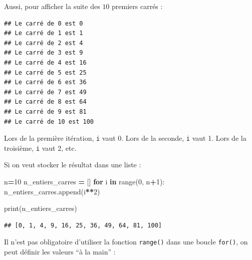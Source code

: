 \documentclass[12pt,]{book}
\newenvironment{Shaded}{\begin{snugshade}}{\end{snugshade}}
\newcommand{\KeywordTok}[1]{\textcolor[rgb]{0.13,0.29,0.53}{\textbf{#1}}}
\newcommand{\DecValTok}[1]{\textcolor[rgb]{0.00,0.00,0.81}{#1}}
\newcommand{\SpecialCharTok}[1]{\textcolor[rgb]{0.00,0.00,0.00}{#1}}
\newcommand{\StringTok}[1]{\textcolor[rgb]{0.31,0.60,0.02}{#1}}
\newcommand{\ControlFlowTok}[1]{\textcolor[rgb]{0.13,0.29,0.53}{\textbf{#1}}}
\newcommand{\OperatorTok}[1]{\textcolor[rgb]{0.81,0.36,0.00}{\textbf{#1}}}
\newcommand{\BuiltInTok}[1]{#1}
\newcommand{\NormalTok}[1]{#1}
\numberwithin{equation}{section}
\numberwithin{countremarque}{section}
\begin{document}
Aussi, pour afficher la suite des \(10\) premiers carrés :

\begin{Shaded}
\end{Shaded}

\begin{lstlisting}
## Le carré de 0 est 0
## Le carré de 1 est 1
## Le carré de 2 est 4
## Le carré de 3 est 9
## Le carré de 4 est 16
## Le carré de 5 est 25
## Le carré de 6 est 36
## Le carré de 7 est 49
## Le carré de 8 est 64
## Le carré de 9 est 81
## Le carré de 10 est 100
\end{lstlisting}

Lors de la première itération, \texttt{i} vaut 0. Lors de la seconde,
\texttt{i} vaut 1. Lors de la troisième, \texttt{i} vaut 2, etc.

Si on veut stocker le résultat dans une liste :

\begin{Shaded}
\begin{Highlighting}[]
\NormalTok{n}\OperatorTok{=}\DecValTok{10}
\NormalTok{n_entiers_carres }\OperatorTok{=}\NormalTok{ []}
\ControlFlowTok{for}\NormalTok{ i }\KeywordTok{in} \BuiltInTok{range}\NormalTok{(}\DecValTok{0}\NormalTok{, n}\OperatorTok{+}\DecValTok{1}\NormalTok{):}
\NormalTok{  n_entiers_carres.append(i}\OperatorTok{**}\DecValTok{2}\NormalTok{)}
  
\BuiltInTok{print}\NormalTok{(n_entiers_carres)}
\end{Highlighting}
\end{Shaded}

\begin{lstlisting}
## [0, 1, 4, 9, 16, 25, 36, 49, 64, 81, 100]
\end{lstlisting}

Il n'est pas obligatoire d'utiliser la fonction \texttt{range()} dans
une boucle \texttt{for()}, on peut définir les valeurs ``à la main'' :

\begin{Shaded}
\end{Shaded}
\end{document}
